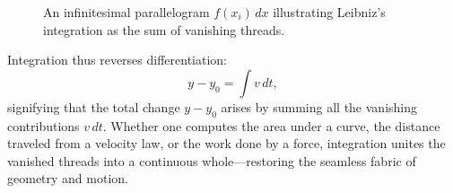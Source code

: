 \begin{figure}[H]
  \centering
  \caption{An infinitesimal parallelogram $f(x_i)\,dx$ illustrating Leibniz’s integration as the sum of vanishing threads.}
  \label{fig:leibniz-integration}
\end{figure}

\medskip


Integration thus reverses differentiation:
\[
y - y_{0}
=
\int v\,dt,
\]
signifying that the total change \(y - y_{0}\) arises by summing all the vanishing contributions \(v\,dt\).  
Whether one computes the area under a curve, the distance traveled from a velocity law, or the work done by 
a force, integration unites the vanished threads into a continuous whole—restoring the seamless fabric of 
geometry and motion.


